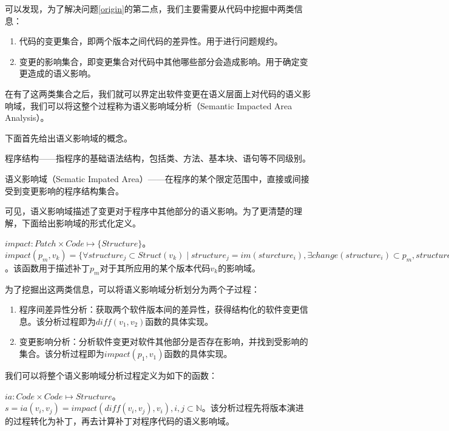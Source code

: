 可以发现，为了解决问题\ref {origin}的第二点，我们主要需要从代码中挖掘中两类信息：
\begin{enumerate}
	\item 代码的变更集合，即两个版本之间代码的差异性。用于进行问题规约。
	\item 变更的影响集合，即变更集合对代码中其他哪些部分会造成影响。用于确定变更造成的语义影响。
\end{enumerate}

在有了这两类集合之后，我们就可以界定出软件变更在语义层面上对代码的语义影响域，我们可以将这整个过程称为语义影响域分析（Semantic Impacted Area Analysis）。

下面首先给出语义影响域的概念。

\begin{definition}
	程序结构——指程序的基础语法结构，包括类、方法、基本块、语句等不同级别。
\end{definition}

\begin{definition}
	语义影响域（Sematic Impated Area）——在程序的某个限定范围中，直接或间接受到变更影响的程序结构集合。
\end{definition}

可见，语义影响域描述了变更对于程序中其他部分的语义影响。为了更清楚的理解，下面给出影响域的形式化定义。

\begin{definition}
	$impact: Patch \times Code \mapsto \{Structure\}$。$impact(p_m, v_k) = \{ \forall structure_j \subset Struct(v_k) \mid structure_j = im(sturcture_i), \exists change(structure_i) \subset p_m,structure_i,\subset Struct(v_k),v_k \subset Code,p_m \subset Pat(v_k), i,j,k,m \subset \mathbb{N} \}$。该函数用于描述补丁$p_m$对于其所应用的某个版本代码$v_k$的影响域。
\end{definition}

为了挖掘出这两类信息，可以将语义影响域分析划分为两个子过程：
\begin{enumerate}
	\item 程序间差异性分析：获取两个软件版本间的差异性，获得结构化的软件变更信息。该分析过程即为$diff(v_1,v_2)$函数的具体实现。
	\item 变更影响分析：分析软件变更对软件其他部分是否存在影响，并找到受影响的集合。该分析过程即为$impact(p_1,v_1)$函数的具体实现。
\end{enumerate}

我们可以将整个语义影响域分析过程定义为如下的函数：

\begin{definition}
	$ia: Code \times Code \mapsto {Structure}$。$s = ia(v_i,v_j) = impact(diff(v_i,v_j),v_i),i,j \subset \mathbb{N}$。该分析过程先将版本演进的过程转化为补丁，再去计算补丁对程序代码的语义影响域。
\end{definition}

